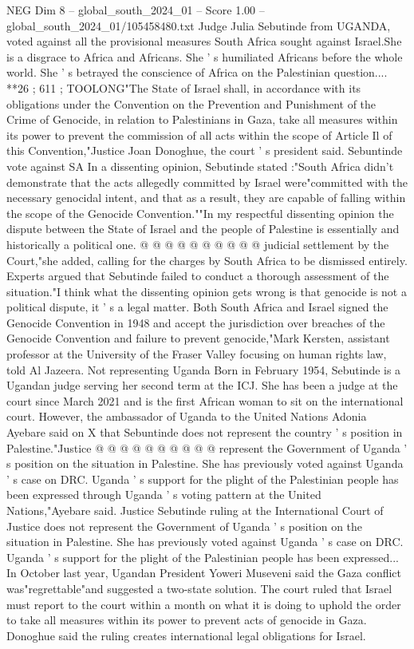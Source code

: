 \begin{textsample}{NEG Dim 8 – global\_south\_2024\_01 – Score 1.00 – global\_south\_2024\_01/105458480.txt}  \label{ex:f8_neg_180}
Judge Julia Sebutinde from UGANDA, voted against all the provisional measures South Africa sought against Israel.She is a disgrace to Africa and Africans.
She ' s humiliated Africans before the whole world.
She ' s betrayed the conscience of Africa on the Palestinian question.... **26 ; 611 ; TOOLONG"The State of Israel shall, in accordance with its obligations under the Convention on the Prevention and Punishment of the Crime of Genocide, in relation to Palestinians in Gaza, take all measures within its power to prevent the commission of all acts within the scope of Article Il of this Convention,"Justice Joan Donoghue, the court ' s president said.
Sebuntinde vote against SA In a dissenting opinion, Sebutinde stated :"South Africa didn't demonstrate that the acts allegedly committed by Israel were"committed with the necessary genocidal intent, and that as a result, they are capable of falling within the scope of the Genocide Convention.""In my respectful dissenting opinion the dispute between the State of Israel and the people of Palestine is essentially and historically a political one. @ @ @ @ @ @ @ @ @ @ judicial settlement by the Court,"she added, calling for the charges by South Africa to be dismissed entirely.
Experts argued that Sebutinde failed to conduct a thorough assessment of the situation."I think what the dissenting opinion gets wrong is that genocide is not a political dispute, it ' s a legal matter.
Both South Africa and Israel signed the Genocide Convention in 1948 and accept the jurisdiction over breaches of the Genocide Convention and failure to prevent genocide,"Mark Kersten, assistant professor at the University of the Fraser Valley focusing on human rights law, told Al Jazeera.
Not representing Uganda Born in February 1954, Sebutinde is a Ugandan judge serving her second term at the ICJ.
She has been a judge at the court since March 2021 and is the first African woman to sit on the international court.
However, the ambassador of Uganda to the United Nations Adonia Ayebare said on X that Sebuntinde does not represent the country ' s position in Palestine."Justice @ @ @ @ @ @ @ @ @ @ represent the Government of Uganda ' s position on the situation in Palestine.
She has previously voted against Uganda ' s case on DRC.
Uganda ' s support for the plight of the Palestinian people has been expressed through Uganda ' s voting pattern at the United Nations,"Ayebare said.
Justice Sebutinde ruling at the International Court of Justice does not represent the Government of Uganda ' s position on the situation in Palestine.
She has previously voted against Uganda ' s case on DRC.
Uganda ' s support for the plight of the Palestinian people has been expressed...
In October last year, Ugandan President Yoweri Museveni said the Gaza conflict was"regrettable"and suggested a two-state solution.
The court ruled that Israel must report to the court within a month on what it is doing to uphold the order to take all measures within its power to prevent acts of genocide in Gaza.
Donoghue said the ruling creates international legal obligations for Israel.

\end{textsample}
